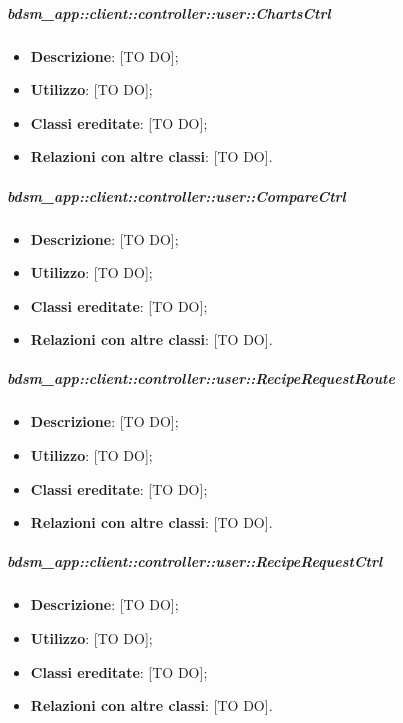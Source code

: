 		\subparagraph{bdsm\_app::client::controller::user::ChartsCtrl} %
		\label{subp:client_controller_user_chartsctrl}
			\begin{itemize}
				\item \textbf{Descrizione}: [TO DO];
				\item \textbf{Utilizzo}: [TO DO];
				\item \textbf{Classi ereditate}: [TO DO];
				\item \textbf{Relazioni con altre classi}: [TO DO].
			\end{itemize}

		\subparagraph{bdsm\_app::client::controller::user::CompareCtrl} %
		\label{subp:client_controller_user_comparectrl}
			\begin{itemize}
				\item \textbf{Descrizione}: [TO DO];
				\item \textbf{Utilizzo}: [TO DO];
				\item \textbf{Classi ereditate}: [TO DO];
				\item \textbf{Relazioni con altre classi}: [TO DO].
			\end{itemize}

		\subparagraph{bdsm\_app::client::controller::user::RecipeRequestRoute} %
		\label{subp:bdsm_app_client_controller_user_reciperequestrouteconfig}
			\begin{itemize}
				\item \textbf{Descrizione}: [TO DO];
				\item \textbf{Utilizzo}: [TO DO];
				\item \textbf{Classi ereditate}: [TO DO];
				\item \textbf{Relazioni con altre classi}: [TO DO].
			\end{itemize}

		\subparagraph{bdsm\_app::client::controller::user::RecipeRequestCtrl} %
		\label{subp:client_controller_user_reciperequestctrl}
			\begin{itemize}
				\item \textbf{Descrizione}: [TO DO];
				\item \textbf{Utilizzo}: [TO DO];
				\item \textbf{Classi ereditate}: [TO DO];
				\item \textbf{Relazioni con altre classi}: [TO DO].
			\end{itemize}

